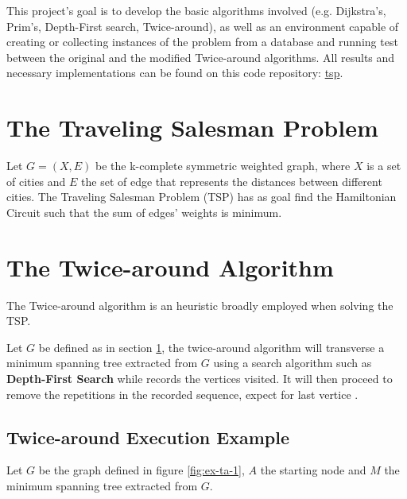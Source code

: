 \documentclass[journal]{IEEEtran}
\begin{document}
This project's goal is to develop the basic algorithms involved (e.g. Dijkstra's, Prim's, Depth-First search, Twice-around), as well as an environment capable of creating or collecting instances of the problem from a database and running test between the original and the modified Twice-around algorithms. All results and necessary implementations can be found on this code repository: \href{https://github.com/lucasdavid/tsp}{tsp}.

\section{The Traveling Salesman Problem}
\label{s:tsp}

Let $G=(X, E)$ be the k-complete symmetric weighted graph, where $X$ is a set of cities and $E$ the set of edge that represents the distances between different cities. The Traveling Salesman Problem (TSP) has as goal find the Hamiltonian Circuit such that the sum of edges' weights is minimum.

\section{The Twice-around Algorithm}

The Twice-around algorithm is an heuristic broadly employed when solving the TSP. 

Let $G$ be defined as in section \ref{s:tsp}, the twice-around algorithm will transverse a minimum spanning tree extracted from $G$ using a search algorithm such as \textbf{Depth-First Search} while records the vertices visited. It will then proceed to remove the repetitions in the recorded sequence, expect for last vertice \cite{eyck}.

\subsection{Twice-around Execution Example}

Let $G$ be the graph defined in figure \ref{fig:ex-ta-1}, $A$ the starting node and $M$ the minimum spanning tree extracted from $G$.
\end{document}
